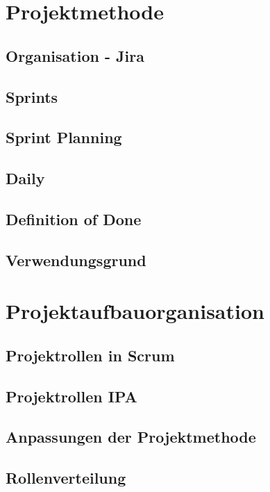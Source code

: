 \chapter{Projektmethode}

\section{Organisation - Jira}

\section{Sprints}

\section{Sprint Planning}

\section{Daily}

\section{Definition of Done}

\section{Verwendungsgrund}

\chapter{Projektaufbauorganisation}

\section{Projektrollen in Scrum}

\section{Projektrollen IPA}

\section{Anpassungen der Projektmethode}

\section{Rollenverteilung}

